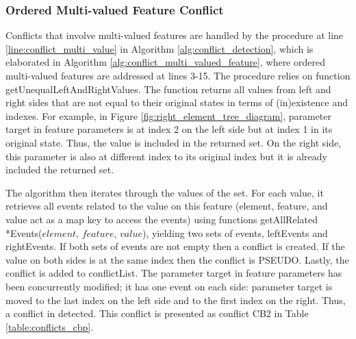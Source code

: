 \subsubsection{Ordered Multi-valued Feature Conflict} 
\label{sec:ordered_conflict}
Conflicts that involve multi-valued features are handled by the procedure at line \ref{line:conflict_multi_value} in Algorithm \ref{alg:conflict_detection}, which is elaborated in Algorithm \ref{alg:conflict_multi_valued_feature}, where ordered multi-valued features are addressed at lines 3-15. The procedure relies on function \textsf{getUnequalLeftAndRightValues}. The function returns all values from left and right sides that are not equal to their original states in terms of (in)existence and indexes. For example, in Figure \ref{fig:right_element_tree_diagram}, parameter \textsf{target} in feature \textsf{parameters} is at index 2 on the left side but at index 1 in its original state. Thus, the value is included in the returned set. On the right side, this parameter is also at different index to its original index but it is already included the returned set. 

The algorithm then iterates through the values of the set. For each value, it retrieves all events related to the value on this feature (element, feature, and value act as a map key to access the events) using functions \textsf{getAllRelated *Events($element$, $feature$, $value$)}, yielding two sets of events, \textsf{leftEvents} and \textsf{rightEvents}. If both sets of events are not empty then a conflict is created. If the value on both sides is at the same index then the conflict is \textsf{PSEUDO}. Lastly, the conflict is added to \textsf{conflictList}. The parameter \textsf{target} in feature \textsf{parameters} has been concurrently modified; it has one event on each side: parameter \textsf{target} is moved to the last index on the left side and to the first index on the right. Thus, a conflict in detected. This conflict is presented as conflict \textsf{CB2} in Table \ref{table:conflicts_cbp}.


